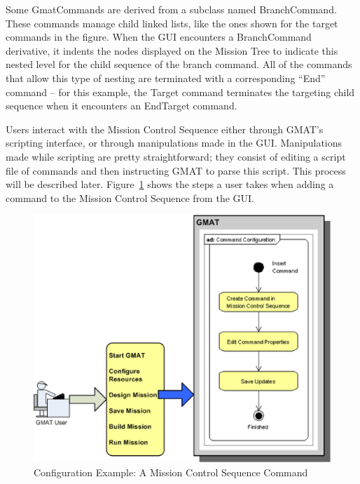 Some GmatCommands are derived from a subclass named BranchCommand.  These commands manage child
linked lists, like the ones shown for the target commands in the figure.  When the GUI encounters a
BranchCommand derivative, it indents the nodes displayed on the Mission Tree to indicate this nested
level for the child sequence of the branch command.  All of the commands that allow this type of
nesting are terminated with a corresponding ``End'' command -- for this example, the Target command
terminates the targeting child sequence when it encounters an EndTarget command.

Users interact with the Mission Control Sequence either through GMAT's scripting interface, or
through manipulations made in the GUI.  Manipulations made while scripting are pretty
straightforward; they consist of editing a script file of commands and then instructing GMAT to
parse this script.  This process will be described later.  Figure~\ref{figure:CommandConfig} shows
the steps a user takes when adding a command to the Mission Control Sequence from the GUI.

\begin{figure}[H]
\begin{center}
\includegraphics[scale=0.5]{Images/GMAT_ConfigureCommand.eps}
\caption{\label{figure:CommandConfig}Configuration Example: A Mission Control Sequence Command}
\end{center}
\end{figure}

